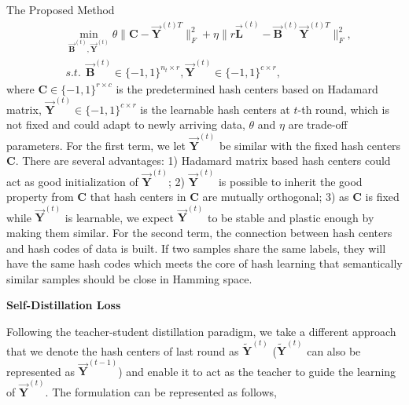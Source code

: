 \documentclass[final]{beamer}
\newlength{\colwidth}
\begin{document}
\begin{frame}[t]
\begin{columns}[t]
\begin{column}{\colwidth}
\begin{block}{The Proposed Method}
					\begin{equation}
						\begin{aligned}
							& \min_{\vec{\mathbf{B}}^{(t)},\vec{\mathbf{Y}}^{(t)}}
							\theta \|\mathbf{C}- \vec{\mathbf{Y}}^{(t)T}\|_{F}^{2} + \eta \| r \vec{\mathbf{L}}^{(t)} - \vec{\mathbf{B}}^{(t)} \vec{\mathbf{Y}}^{(t)T} \|_F^2, \\
							&s.t. \ \ \vec{\mathbf{B}}^{(t)} \in \{-1,1\}^{n_{t} \times r}, \vec{\mathbf{Y}}^{(t)} \in   \{-1, 1\}^{c \times r},
						\end{aligned}
						\label{pro_smi_embedding}
					\end{equation}
					where $\mathbf{C} \in \{-1,1\}^{r \times c}$ is the predetermined hash centers based on Hadamard matrix, $\vec{\mathbf{Y}}^{(t)} \in \{-1,1\}^{c \times r}$ is the learnable hash centers at $t$-th round, which is not fixed and could adapt to newly arriving data, $\theta$ and $\eta$ are trade-off parameters. For the first term, we let $\vec{\mathbf{Y}}^{(t)}$ be similar with the fixed hash centers $\mathbf{C}$. There are several advantages: 1) Hadamard matrix based hash centers could act as good initialization of $\vec{\mathbf{Y}}^{(t)}$; 2) $\vec{\mathbf{Y}}^{(t)}$ is possible to inherit the good property from $\mathbf{C}$ that hash centers in $\mathbf{C}$ are mutually orthogonal; 3) as $\mathbf{C}$ is fixed while $\vec{\mathbf{Y}}^{(t)}$ is learnable, we expect $\vec{\mathbf{Y}}^{(t)}$ to be stable and plastic enough by making them similar. For the second term, the connection between hash centers and hash codes of data is built. If two samples share the same labels, they will have the same hash codes which meets the core of hash learning that semantically similar samples should be close in Hamming space.
					
					
					\textbf{Self-Distillation Loss}
					
					Following the teacher-student distillation paradigm, we take a different approach that we denote the hash centers of last round as  $\tilde{\mathbf{Y}}^{(t)}$ ($\tilde{\mathbf{Y}}^{(t)}$ can also be represented as $\vec{\mathbf{Y}}^{(t-1)}$) and enable it to act as the teacher to guide the learning of $\vec{\mathbf{Y}}^{(t)}$. The formulation can be represented as follows, 
					
					\vspace{-2mm}


\end{block}
\end{column}
\end{columns}
\end{frame}
\end{document}
